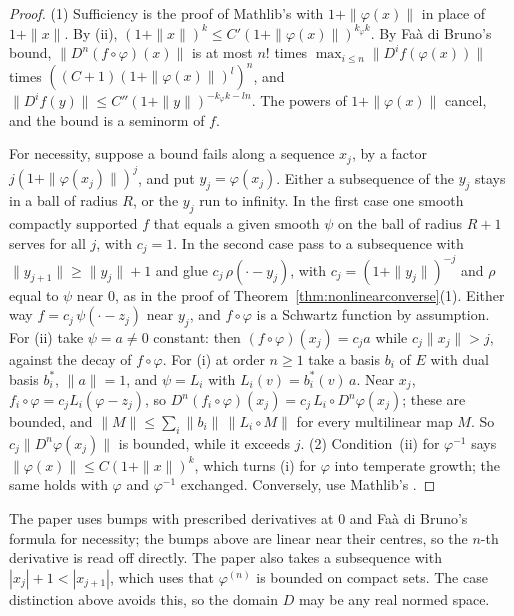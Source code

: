 \documentclass[11pt]{article}
\theoremstyle{definition}
\begin{document}
\begin{proof}
  (1) Sufficiency is the proof of Mathlib's  with
  $1 + \|\varphi(x)\|$ in place of $1 + \|x\|$. By (ii),
  $(1 + \|x\|)^k \le C'(1 + \|\varphi(x)\|)^{k_\varphi k}$. By Faà di Bruno's bound,
  $\|D^n(f \circ \varphi)(x)\|$ is at most $n!$ times $\max_{i \le n}\|D^i f(\varphi(x))\|$ times
  $((C + 1)(1 + \|\varphi(x)\|)^l)^n$, and $\|D^i f(y)\| \le C''(1 + \|y\|)^{-k_\varphi k - ln}$.
  The powers of $1 + \|\varphi(x)\|$ cancel, and the bound is a seminorm of $f$.

  For necessity, suppose a bound fails along a sequence $x_j$, by a factor
  $j(1 + \|\varphi(x_j)\|)^j$, and put $y_j = \varphi(x_j)$. Either a subsequence of the $y_j$
  stays in a ball of radius $R$, or the $y_j$ run to infinity. In the first case one smooth
  compactly supported $f$ that equals a given smooth $\psi$ on the ball of radius $R + 1$ serves
  for all $j$, with $c_j = 1$. In the second case pass to a subsequence with
  $\|y_{j+1}\| \ge \|y_j\| + 1$ and glue $c_j\,\rho(\cdot - y_j)$, with
  $c_j = (1 + \|y_j\|)^{-j}$ and $\rho$ equal to $\psi$ near $0$, as in the proof of
  Theorem~\ref{thm:nonlinearconverse}(1). Either way $f = c_j\,\psi(\cdot - z_j)$ near $y_j$, and
  $f \circ \varphi$ is a Schwartz function by assumption. For (ii) take $\psi = a \ne 0$
  constant: then $(f \circ \varphi)(x_j) = c_j a$ while $c_j \|x_j\| > j$, against the decay of
  $f \circ \varphi$. For (i) at order $n \ge 1$ take a basis $b_i$ of $E$ with dual basis
  $b_i^*$, $\|a\| = 1$, and $\psi = L_i$ with $L_i(v) = b_i^*(v)\,a$. Near $x_j$,
  $f_i \circ \varphi = c_j L_i(\varphi - z_j)$, so
  $D^n(f_i \circ \varphi)(x_j) = c_j\,L_i \circ D^n\varphi(x_j)$; these are bounded, and
  $\|M\| \le \sum_i \|b_i\|\,\|L_i \circ M\|$ for every multilinear map $M$. So
  $c_j\|D^n\varphi(x_j)\|$ is bounded, while it exceeds $j$.
  (2) Condition~(ii) for $\varphi^{-1}$ says $\|\varphi(x)\| \le C(1 + \|x\|)^k$, which turns (i)
  for $\varphi$ into temperate growth; the same holds with $\varphi$ and $\varphi^{-1}$
  exchanged. Conversely, use Mathlib's .
\end{proof}

The paper uses bumps with prescribed derivatives at $0$ and Faà di Bruno's formula for
necessity; the bumps above are linear near their centres, so the $n$-th derivative is read off
directly. The paper also takes a subsequence with $|x_j| + 1 < |x_{j+1}|$, which uses that
$\varphi^{(n)}$ is bounded on compact sets. The case distinction above avoids this, so the
domain $D$ may be any real normed space.
\end{document}
